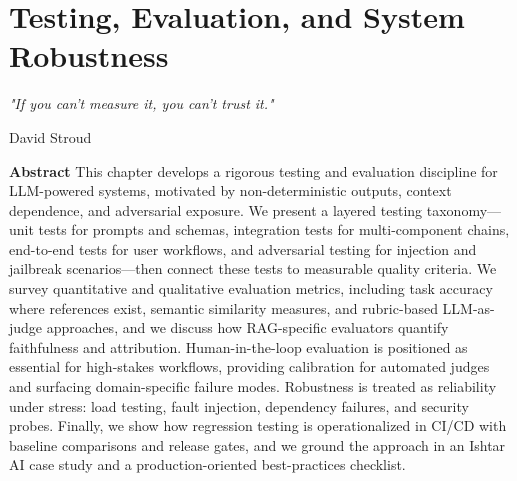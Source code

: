 \chapter{Testing, Evaluation, and System Robustness}
\label{ch:testing}
\newrefsegment


\epigraph{\emph{"If you can't measure it, you can't trust it."}}{David Stroud}

\textbf{Abstract} This chapter develops a rigorous testing and evaluation discipline for LLM-powered systems, motivated by non-deterministic outputs, context dependence, and adversarial exposure. We present a layered testing taxonomy—unit tests for prompts and schemas, integration tests for multi-component chains, end-to-end tests for user workflows, and adversarial testing for injection and jailbreak scenarios—then connect these tests to measurable quality criteria. We survey quantitative and qualitative evaluation metrics, including task accuracy where references exist, semantic similarity measures, and rubric-based LLM-as-judge approaches, and we discuss how RAG-specific evaluators quantify faithfulness and attribution. Human-in-the-loop evaluation is positioned as essential for high-stakes workflows, providing calibration for automated judges and surfacing domain-specific failure modes. Robustness is treated as reliability under stress: load testing, fault injection, dependency failures, and security probes. Finally, we show how regression testing is operationalized in CI/CD with baseline comparisons and release gates, and we ground the approach in an Ishtar AI case study and a production-oriented best-practices checklist.

